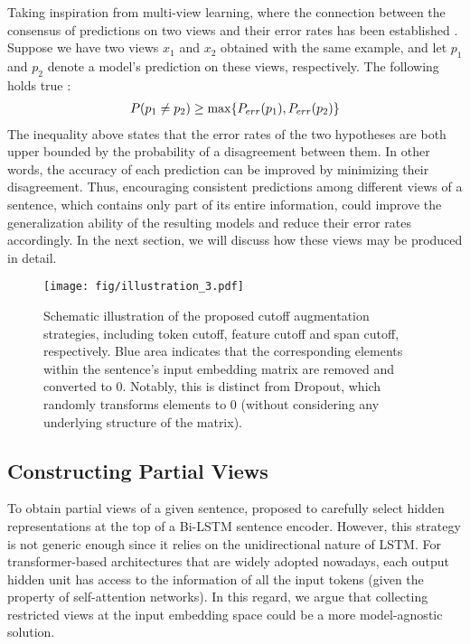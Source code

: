 \documentclass[11pt,a4paper]{article}
\begin{document}
Taking inspiration from multi-view learning, where the connection between the consensus of predictions on two views and their error rates has been established \cite{dasgupta2002pac}. Suppose we have two views $x_1$ and $x_2$ obtained with the same example, and let $p_1$ and $p_2$ denote a model's prediction on these views, respectively. The following holds true \cite{dasgupta2002pac}:
\begin{align}
\vspace{-4mm}
P(p_1 \neq p_2)  \geq \max \{P_{err}(p_1), P_{err}(p_2) \}
\label{eq:multi_view}
\vspace{-4mm}
\end{align}
The inequality above states that the error rates of the two hypotheses are both upper bounded by the probability of a disagreement between them. In other words, the accuracy of each prediction can be improved by minimizing their disagreement. Thus, encouraging consistent predictions among different views of a sentence, which contains only part of its entire information, could improve the generalization ability of the resulting models and reduce their error rates accordingly. In the next section, we will discuss how these views may be produced in detail. 
\begin{figure*}
	\centering
	\texttt{[image: fig/illustration\_3.pdf]} 
	\vspace{-4mm}
	\caption{Schematic illustration of the proposed cutoff augmentation strategies, including token cutoff, feature cutoff and span cutoff, respectively. Blue area indicates that the corresponding elements within the sentence's input embedding matrix are removed and converted to $0$. Notably, this is distinct from Dropout, which randomly transforms elements to $0$ (without considering any underlying structure of the matrix). }
	\label{fig:illustration}
	\vspace{-4mm}
\end{figure*}
\vspace{-4mm}
\subsection{Constructing Partial Views}
\vspace{-1mm}
To obtain partial views of a given sentence, \cite{Clark2018SemiSupervisedSM} proposed to carefully select hidden representations at the top of a Bi-LSTM sentence encoder. However, this strategy is not generic enough since it relies on the unidirectional nature of LSTM. For transformer-based architectures that are widely adopted nowadays, each output hidden unit has access to the information of all the input tokens (given the property of self-attention networks). In this regard, we argue that collecting restricted views at the input embedding space could be a more model-agnostic solution.
\end{document}
